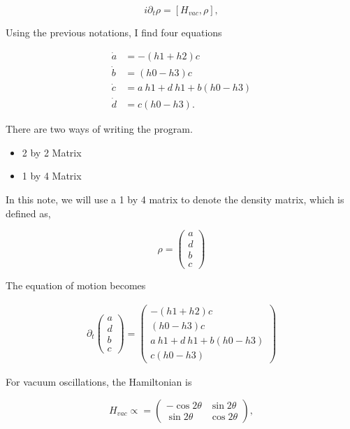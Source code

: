 \documentclass{tufte-handout}
\begin{document}
\begin{equation}
i \partial_t \rho = \left[ H_{vac}, \rho \right],
\end{equation}

Using the previous notations, I find four equations

\begin{align}
\dot a &= - (h1+h2) c \\
\dot b &= (h0-h3) c \\
\dot c &= a ~ h1 + d~h1 + b (h0-h3) \\
\dot d & = c (h0-h3).
\end{align}



There are two ways of writing the program.

\begin{itemize}
\item 2 by 2 Matrix
\item 1 by 4 Matrix
\end{itemize}



In this note, we will use a 1 by 4 matrix to denote the density matrix, which is defined as,

\begin{equation}
\rho = \begin{pmatrix} a \\ d \\ b \\ c
\end{pmatrix}
\end{equation}

The equation of motion becomes

\begin{align}
\partial_t \begin{pmatrix} a \\ d \\ b \\ c
\end{pmatrix}  = \begin{pmatrix} - (h1+h2) c \\  (h0-h3) c  \\ a~h1 + d~h1 + b (h0-h3) \\ c (h0-h3)  \end{pmatrix}
\end{align}


For vacuum oscillations, the Hamiltonian is

\begin{equation}
H_{vac} \propto = \begin{pmatrix} -\cos 2\theta & \sin 2\theta \\ \sin 2\theta & \cos 2\theta \end{pmatrix},
\end{equation}
\end{document}
